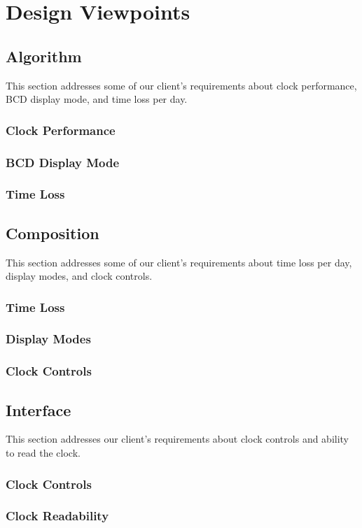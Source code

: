 \documentclass[10pt,draftclsnofoot,onecolumn]{IEEEtran}
\begin{document}
\section{Design Viewpoints}

\subsection{Algorithm}
This section addresses some of our client's requirements about clock performance, BCD display mode, and time loss per day.

\subsubsection{Clock Performance}

\subsubsection{BCD Display Mode}

\subsubsection{Time Loss}

\subsection{Composition}
This section addresses some of our client's requirements about time loss per day, display modes, and clock controls. 

\subsubsection{Time Loss}

\subsubsection{Display Modes}

\subsubsection{Clock Controls}

\subsection{Interface} 
This section addresses our client's requirements about clock controls and ability to read the clock. 

\subsubsection{Clock Controls}

\subsubsection{Clock Readability}
\end{document}
